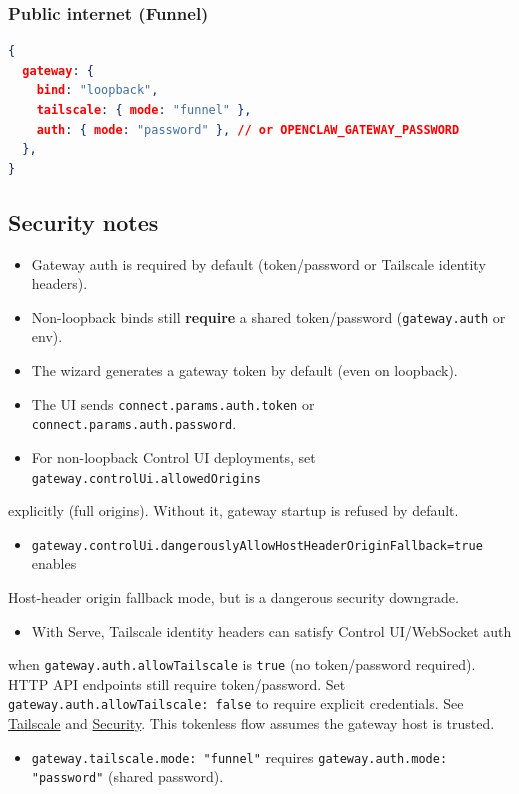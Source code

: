 \subsubsection{Public internet (Funnel)}


\begin{lstlisting}[language=json]
{
  gateway: {
    bind: "loopback",
    tailscale: { mode: "funnel" },
    auth: { mode: "password" }, // or OPENCLAW_GATEWAY_PASSWORD
  },
}
\end{lstlisting}


\subsection{Security notes}


\begin{itemize}
  \item Gateway auth is required by default (token/password or Tailscale identity headers).
  \item Non-loopback binds still \textbf{require} a shared token/password (\texttt{gateway.auth} or env).
  \item The wizard generates a gateway token by default (even on loopback).
  \item The UI sends \texttt{connect.params.auth.token} or \texttt{connect.params.auth.password}.
  \item For non-loopback Control UI deployments, set \texttt{gateway.controlUi.allowedOrigins}
\end{itemize}

explicitly (full origins). Without it, gateway startup is refused by default.
\begin{itemize}
  \item \texttt{gateway.controlUi.dangerouslyAllowHostHeaderOriginFallback=true} enables
\end{itemize}

Host-header origin fallback mode, but is a dangerous security downgrade.
\begin{itemize}
  \item With Serve, Tailscale identity headers can satisfy Control UI/WebSocket auth
\end{itemize}

when \texttt{gateway.auth.allowTailscale} is \texttt{true} (no token/password required).
HTTP API endpoints still require token/password. Set
\texttt{gateway.auth.allowTailscale: false} to require explicit credentials. See
\href{/gateway/tailscale}{Tailscale} and \href{/gateway/security}{Security}. This
tokenless flow assumes the gateway host is trusted.
\begin{itemize}
  \item \texttt{gateway.tailscale.mode: "funnel"} requires \texttt{gateway.auth.mode: "password"} (shared password).
\end{itemize}


